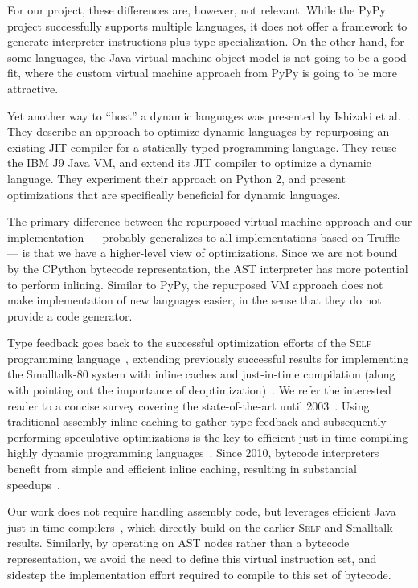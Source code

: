For our project, these differences are, however, not relevant.
While the PyPy project successfully supports multiple languages, it does not offer a framework to generate interpreter instructions plus type specialization.
On the other hand, for some languages, the Java virtual machine object model is not going to be a good fit, where the custom virtual machine approach from PyPy is going to be more attractive.

Yet another way to ``host'' a dynamic languages was presented by Ishizaki et al.~\cite{Ishizaki.etal+12}.
They describe an approach to optimize dynamic languages by repurposing an existing JIT compiler for a statically typed programming language.
They reuse the IBM J9 Java VM, and extend its JIT compiler to optimize a dynamic language.
They experiment their approach on Python 2, and present optimizations that are specifically beneficial for dynamic languages.

The primary difference between the repurposed virtual machine approach and our implementation --- probably generalizes to all implementations based on Truffle --- is that we have a higher-level view of optimizations.
Since we are not bound by the CPython bytecode representation, the AST interpreter has more potential to perform inlining.
Similar to PyPy, the repurposed VM approach does not make implementation of new languages easier, in the sense that they do not provide a code generator.

Type feedback goes back to the successful optimization efforts of the \textsc{Self} programming language~\cite{Chambers+self+1989,Holzle+debugging+1992,holzle.ungar+94,holzle+94,Holzle+self+1994}, extending previously successful results for implementing the Smalltalk-80 system with inline caches and just-in-time compilation (along with pointing out the importance of deoptimization)~\cite{Deutsch1984}.
We refer the interested reader to a concise survey covering the state-of-the-art until 2003~\cite{aycock+03}.
Using traditional assembly inline caching to gather type feedback and subsequently performing speculative optimizations is the key to efficient just-in-time compiling highly dynamic programming languages~\cite{chang.etal+11}.
Since 2010, bytecode interpreters benefit from simple and efficient inline caching, resulting in substantial speedups~\cite{Brunthaler2010inca,williams.etal+10}.

Our work does not require handling assembly code, but leverages efficient Java just-in-time compilers~\cite{kotzmann.etal+08,paleczny.etal+01,wimmer.franz+10}, which directly build on the earlier
\textsc{Self} and Smalltalk results. Similarly, by operating on AST nodes rather than a bytecode representation, we avoid the need to define this virtual instruction set, and sidestep the implementation effort required to compile to this set of bytecode.

